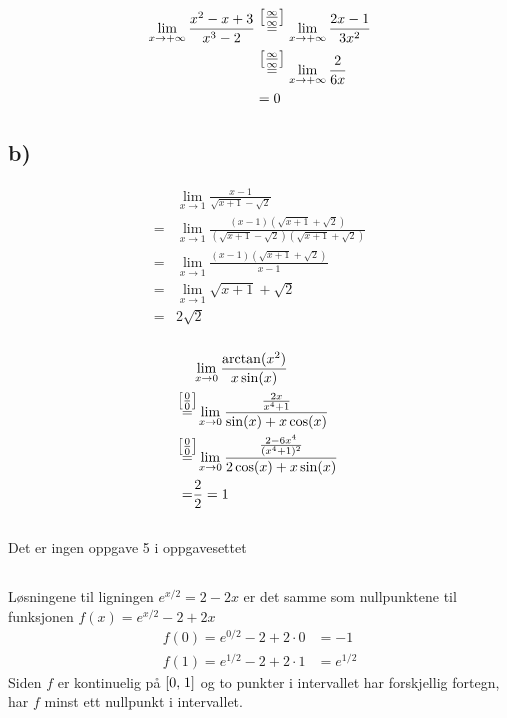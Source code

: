 \documentclass[defaultpackages]{cheatsheet}
\newcommand\infinf{\stackrel{\mathclap{\normalfont\mbox{$\left[\frac{\infty}{\infty}\right]$}}}{=}}
\newcommand\nillnill{\stackrel{\mathclap{\normalfont\mbox{$\left[\frac{0}{0}\right]$}}}{=}}
\begin{document}
\subsection{}
\subsubsection{}
\begin{align*}
	\lim_{x\to +\infty} \frac{x^2-x+3}{x^3 - 2}&\;\; \infinf\;\; \lim_{x\to +\infty} \frac{2x-1}{3x^2}
	\\
	&\;\;\infinf\;\; \lim_{x\to +\infty} \frac{2}{6x}
	\\&= 0
\end{align*}
\subsection*{b)}
\begin{align*}
	&\lim_{x\to 1} \frac{x-1}{\sqrt{x+1} - \sqrt{2}}\\
	=&\lim_{x\to 1} \frac{(x-1)(\sqrt{x+1} + \sqrt{2})}{(\sqrt{x+1} - \sqrt{2})(\sqrt{x+1} + \sqrt{2})}\\
	=& \lim_{x\to 1} \frac{(x-1)(\sqrt{x+1} + \sqrt{2})}{x-1}\\
	=& \lim_{x\to 1} \sqrt{x+1} + \sqrt{2}\\
	=& 2\sqrt{2}
\end{align*}
\subsubsection{}
\begin{align*}
	&\lim_{x\to 0} \frac{\arctan(x^2)}{x\sin(x)}
	\\\nillnill&\; \lim_{x\to 0} \frac{\frac{2x}{x^4+1}}{\sin(x) + x\cos(x)}\\
	\nillnill& \;\lim_{x\to 0} \frac{\frac{2-6x^4}{(x^4+1)^2}}{2\cos(x) + x\sin(x)}\\
	=& \frac{2}{2} = 1
\end{align*}
\subsection{}
Det er ingen oppgave 5 i oppgavesettet
\subsection{}
\subsubsection{}
Løsningene til ligningen $e^{x/2} = 2-2x$ er det samme som nullpunktene til funksjonen $f(x) = e^{x/2} - 2+2x$
\begin{align*}
	f(0) = e^{0/2} - 2 + 2\cdot 0 &= -1\\
	f(1) = e^{1/2} - 2 + 2 \cdot 1 &= e^{1/2}
\end{align*}
Siden $f$ er kontinuelig på $\interval[{0,\;1}]$ og to punkter i intervallet har forskjellig fortegn, har $f$ minst ett nullpunkt i intervallet.
\end{document}
